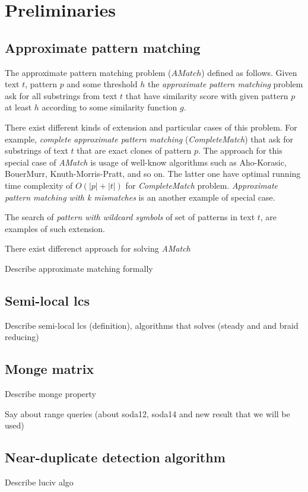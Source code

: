 \section{Preliminaries}
\label{section:preliminaries}

\subsection{Approximate pattern matching}
The approximate pattern matching problem ($AMatch$) defined as follows.
Given text $t$, pattern $p$ and some threshold $h$ the \emph{approximate pattern matching} problem ask for all substrings from text $t$ that have similarity score  with given pattern $p$ at least $h$ according to some similarity function $g$.  

There exist different kinds of extension and particular cases of this problem.
For example, \emph{complete approximate pattern matching} (\emph{CompleteMatch}) that ask for
substrings of text $t$ that are exact clones of pattern $p$.
The approach for this special case of \emph{AMatch} is usage of well-know  algorithms such as  Aho-Korasic, BouerMurr, Knuth-Morris-Pratt, and so on.
The latter one have optimal running time complexity of $O(|p|+|t|)$ for \emph{CompleteMatch} problem.
\emph{Approximate pattern matching with k mismatches} is an another example of special case.



 
The search of \emph{pattern with wildcard symbols} of set of patterns in text $t$, are examples of such extension.





There exist differenct approach for solving \emph{AMatch}





Describe approximate matching formally

\subsection{Semi-local lcs}
Describe semi-local lcs (definition), algorithms that solves (steady and and braid reducing)

\subsection{Monge matrix}
Describe monge property  


Say about range queries (about soda12, soda14 and new result that we will be used)

\subsection{Near-duplicate detection algorithm}

Describe luciv algo

